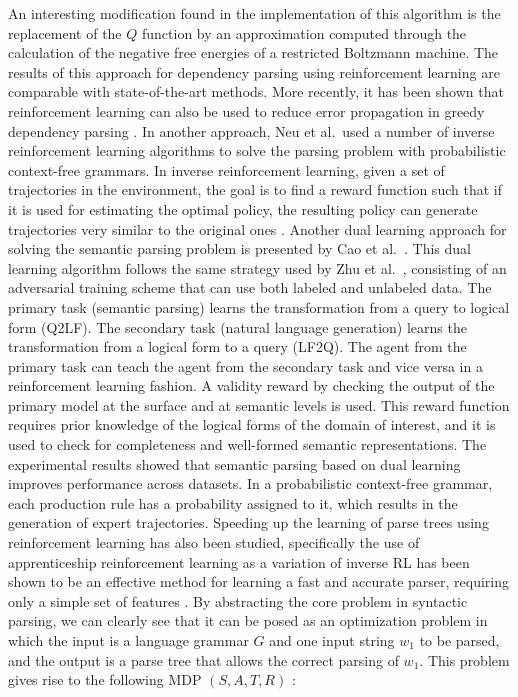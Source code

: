 An interesting modification found in the implementation of this algorithm is the replacement of the $Q$ function by an approximation computed through the calculation of the negative free energies of a restricted Boltzmann machine. The results of this approach for dependency parsing using reinforcement learning are comparable with state-of-the-art methods. More recently, it has been shown that reinforcement learning can also be used to reduce error propagation in greedy dependency parsing . In another approach, Neu et al.\  used a number of inverse reinforcement learning algorithms to solve the parsing problem with probabilistic context-free grammars. In inverse reinforcement learning, given a set of trajectories in the environment, the goal is to find a reward function such that if it is used for estimating the optimal policy, the resulting policy can generate trajectories very similar to the original ones . 
Another dual learning approach for solving the semantic parsing problem is presented by Cao et al.\ . This dual learning algorithm follows the same strategy used by Zhu et al.\ , consisting of an adversarial training scheme that can use both labeled and unlabeled data. The primary task (semantic parsing) learns the transformation from a query to logical form (Q2LF). The secondary task (natural language generation) learns the transformation from a logical form to a query (LF2Q). The agent from the primary task can teach the agent from the secondary task and vice versa in a reinforcement learning fashion. A validity reward by checking the output of the primary model at the surface and at semantic levels is used. This reward function requires prior knowledge of the logical forms of the domain of interest, and it is used to check for completeness and well-formed semantic representations. The experimental results showed that semantic parsing based on dual learning improves performance across datasets.
In a probabilistic context-free grammar, each production rule has a probability assigned to it, which results in the generation of expert trajectories. Speeding up the learning of parse trees using reinforcement learning has also been studied, specifically the use of apprenticeship reinforcement learning as a variation of inverse RL has been shown to be an effective method for learning a fast and accurate parser, requiring only a simple set of features . 
By abstracting the core problem in syntactic parsing, we  can clearly see that it can be posed as an optimization problem in which the input is a language grammar $G$ and one input string $w_1$ to be parsed, and the output is a parse tree that allows the correct parsing of $w_1$.  This problem gives rise to the following MDP $(S,A,T,R)$  :

